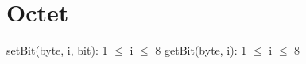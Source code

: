 \section{Octet}

\begin{algorithme}
    {setBit(byte, i, bit): 1 $\leq$ i $\leq$ 8}
    {getBit(byte, i): 1 $\leq$ i $\leq$ 8}
\end{algorithme}